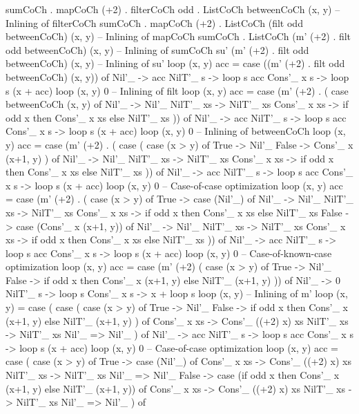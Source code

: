 \begin{spec}
sumCoCh . mapCoCh (+2) . filterCoCh odd . ListCoCh betweenCoCh (x, y)
-- Inlining of filterCoCh
sumCoCh . mapCoCh (+2) . ListCoCh (filt odd betweenCoCh) (x, y)
-- Inlining of mapCoCh
sumCoCh . ListCoCh (m' (+2) . filt odd betweenCoCh) (x, y)
-- Inlining of sumCoCh
su' (m' (+2) . filt odd betweenCoCh) (x, y)
-- Inlining of su'
loop (x, y) acc = case ((m' (+2) . filt odd betweenCoCh) (x, y)) of
  Nil'_ -> acc
  NilT'_ s -> loop s acc
  Cons'_ x s -> loop s (x + acc)
loop (x, y) 0
-- Inlining of filt
loop (x, y) acc = case (m' (+2) . (
  case betweenCoCh (x, y) of 
      Nil'_ -> Nil'_
      NilT'_ xs -> NilT'_ xs
      Cons'_ x xs -> if odd x then Cons'_ x xs else NilT'_ xs
)) of
  Nil'_ -> acc
  NilT'_ s -> loop s acc
  Cons'_ x s -> loop s (x + acc)
loop (x, y) 0
-- Inlining of betweenCoCh
loop (x, y) acc = case (m' (+2) . (
  case (
    case (x > y) of
      True -> Nil'_
      False -> Cons'_ x (x+1, y)
    ) of 
    Nil'_ -> Nil'_
    NilT'_ xs -> NilT'_ xs
    Cons'_ x xs -> if odd x then Cons'_ x xs else NilT'_ xs
)) of
  Nil'_ -> acc
  NilT'_ s -> loop s acc
  Cons'_ x s -> loop s (x + acc)
loop (x, y) 0
-- Case-of-case optimization
loop (x, y) acc = case (m' (+2) . (
  case (x > y) of
    True -> case (Nil'_) of
      Nil'_ -> Nil'_
      NilT'_ xs -> NilT'_ xs
      Cons'_ x xs -> if odd x then Cons'_ x xs else NilT'_ xs
    False -> case (Cons'_ x (x+1, y)) of
      Nil'_ -> Nil'_
      NilT'_ xs -> NilT'_ xs
      Cons'_ x xs -> if odd x then Cons'_ x xs else NilT'_ xs
)) of
  Nil'_ -> acc
  NilT'_ s -> loop s acc
  Cons'_ x s -> loop s (x + acc)
loop (x, y) 0
-- Case-of-known-case optimization
loop (x, y) acc = case (m' (+2) (
  case (x > y) of
    True -> Nil'_
    False -> if odd x then Cons'_ x (x+1, y) else NilT'_ (x+1, y)
)) of
  Nil'_ -> 0
  NilT'_ s -> loop s
  Cons'_ x s -> x + loop s
loop (x, y)
-- Inlining of m'
loop (x, y) = case (
  case (
    case (x > y) of
      True -> Nil'_
      False -> if odd x then Cons'_ x (x+1, y) else NilT'_ (x+1, y)
  ) of
    Cons'_ x xs -> Cons'_ ((+2) x) xs
    NilT'_ xs -> NilT'_ xs
    Nil'_ => Nil'_
) of
  Nil'_ -> acc
  NilT'_ s -> loop s acc
  Cons'_ x s -> loop s (x + acc)
loop (x, y) 0
-- Case-of-case optimization
loop (x, y) acc = case (
  case (x > y) of
    True -> case (Nil'_) of
      Cons'_ x xs -> Cons'_ ((+2) x) xs
      NilT'_ xs -> NilT'_ xs
      Nil'_ => Nil'_
    False -> case (if odd x then Cons'_ x (x+1, y) else NilT'_ (x+1, y)) of
      Cons'_ x xs -> Cons'_ ((+2) x) xs
      NilT'_ xs -> NilT'_ xs
      Nil'_ => Nil'_
) of

\end{spec}
